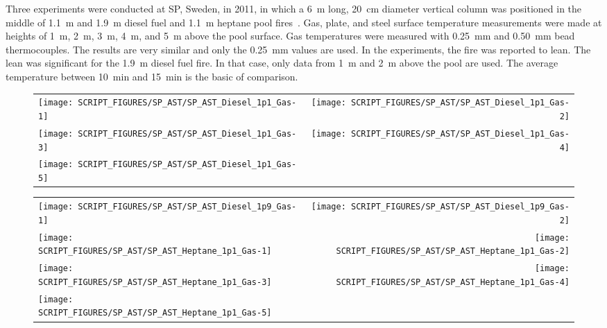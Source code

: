 \clearpage

Three experiments were conducted at SP, Sweden, in 2011, in which a 6~m long, 20~cm diameter vertical column was positioned in the middle of 1.1~m and 1.9~m diesel fuel and 1.1~m heptane pool fires~\cite{Sjostrom:AST}. Gas, plate, and steel surface temperature measurements were made at heights of 1~m, 2~m, 3~m, 4~m, and 5~m above the pool surface. Gas temperatures were measured with 0.25~mm and 0.50~mm bead thermocouples. The results are very similar and only the 0.25~mm values are used. In the experiments, the fire was reported to lean. The lean was significant for the 1.9~m diesel fuel fire. In that case, only data from 1~m and 2~m above the pool are used. The average temperature between 10~min and 15~min is the basic of comparison.

\begin{figure}[h!]
\begin{tabular*}{\textwidth}{l@{\extracolsep{\fill}}r}
\texttt{[image: SCRIPT\_FIGURES/SP\_AST/SP\_AST\_Diesel\_1p1\_Gas-1]}   &  \texttt{[image: SCRIPT\_FIGURES/SP\_AST/SP\_AST\_Diesel\_1p1\_Gas-2]}    \\
\texttt{[image: SCRIPT\_FIGURES/SP\_AST/SP\_AST\_Diesel\_1p1\_Gas-3]}   &  \texttt{[image: SCRIPT\_FIGURES/SP\_AST/SP\_AST\_Diesel\_1p1\_Gas-4]}     \\
\texttt{[image: SCRIPT\_FIGURES/SP\_AST/SP\_AST\_Diesel\_1p1\_Gas-5]}   &
\end{tabular*}
\label{SP_Diesel_1p1_Gas}
\end{figure}

\newpage

\begin{figure}[p]
\begin{tabular*}{\textwidth}{l@{\extracolsep{\fill}}r}
\texttt{[image: SCRIPT\_FIGURES/SP\_AST/SP\_AST\_Diesel\_1p9\_Gas-1]}   &  \texttt{[image: SCRIPT\_FIGURES/SP\_AST/SP\_AST\_Diesel\_1p9\_Gas-2]}    \\
\texttt{[image: SCRIPT\_FIGURES/SP\_AST/SP\_AST\_Heptane\_1p1\_Gas-1]}  &  \texttt{[image: SCRIPT\_FIGURES/SP\_AST/SP\_AST\_Heptane\_1p1\_Gas-2]}    \\
\texttt{[image: SCRIPT\_FIGURES/SP\_AST/SP\_AST\_Heptane\_1p1\_Gas-3]}  &  \texttt{[image: SCRIPT\_FIGURES/SP\_AST/SP\_AST\_Heptane\_1p1\_Gas-4]}     \\
\texttt{[image: SCRIPT\_FIGURES/SP\_AST/SP\_AST\_Heptane\_1p1\_Gas-5]}  &
\end{tabular*}
\label{SP_Diesel_1p9_Gas}
\end{figure}

